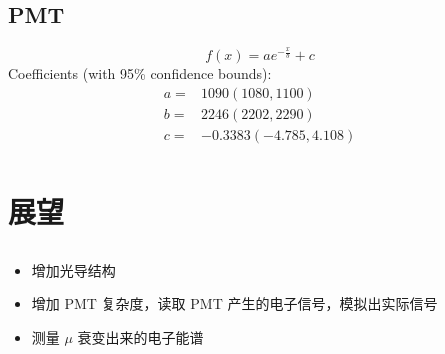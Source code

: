 \documentclass[notheorems, aspectratio=54]{beamer}
\begin{document}
\subsection{PMT}
\begin{frame}
\begin{figure}[htbp]
\centering
{}
\end{figure}

$$
    f(x) = a e^{-\frac{x}{b}}+c
$$
     Coefficients (with 95\% confidence bounds):
     \begin{align}
       a =&        1090  (1080, 1100)\nonumber\\
       b =&        2246  (2202, 2290)\nonumber\\
       c =&        -0.3383  (-4.785, 4.108)\nonumber\\
     \end{align}

\end{frame}

\section{展望}
\subsection{}
\begin{frame}
\begin{itemize}
  \item 增加光导结构
  \item 增加 PMT 复杂度，读取 PMT 产生的电子信号，模拟出实际信号
  \item 测量 $\mu$ 衰变出来的电子能谱
\end{itemize}
\end{frame}
\end{document}
